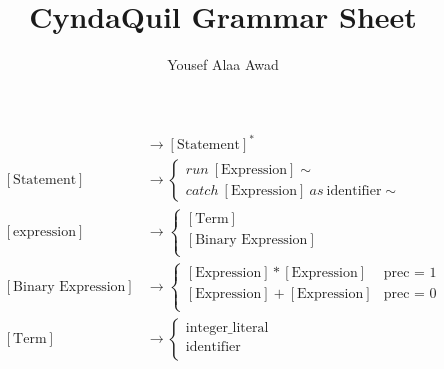 \documentclass[12pt, letterpaper]{article}
\title{CyndaQuil Grammar Sheet}
\author{Yousef Alaa Awad}
\begin{document}
\maketitle
\begin{align}
  [\text{Program}] &\to [\text{Statement}]^* \\
  [\text{Statement}] &\to \begin{cases}
    run\ [\text{Expression}]\sim \\
    catch\  [\text{Expression}]\ as\ \text{identifier}\sim
  \end{cases} \\
  [\text{expression}]&\to \begin{cases}
    [\text{Term}] \\
    [\text{Binary Expression}] \\
  \end{cases} \\
  [\text{Binary Expression}] &\to \begin{cases}
    [\text{Expression}] * [\text{Expression}] & \text{prec = 1}\\
    [\text{Expression}] + [\text{Expression}] &  \text{prec = 0}\\ 
  \end{cases} \\
  [\text{Term}] &\to \begin{cases}
  \text{integer\_literal} \\
  \text{identifier} \\
  \end{cases}
\end{align}
\end{document}
